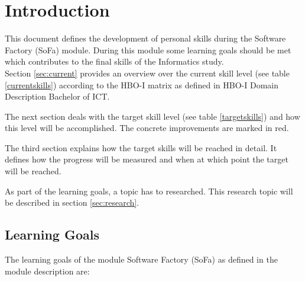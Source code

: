 \section{Introduction}
\label{sec:intro}


This document defines the development of personal skills during the Software Factory (SoFa) module.
During this module some learning goals should be met which contributes to the final skills of the Informatics study.
~\\
Section \ref{sec:current} provides an overview over the current skill level (see table \ref{currentskills}) according to the HBO-I matrix as defined in \glqq HBO-I Domain Description Bachelor of ICT\grqq.

The next section deals with the target skill level (see table \ref{targetskills}) and how this level will be accomplished. The concrete improvements are marked in red.

The third section explains how the target skills will be reached in detail. It defines how the progress will be measured and when at which point the target will be reached.

As part of the learning goals, a topic has to researched. This research topic will be described in section \ref{sec:research}.



\subsection{Learning Goals}
\label{ssec:learning}
The learning goals of the module Software Factory (SoFa) as defined in the module description are:

